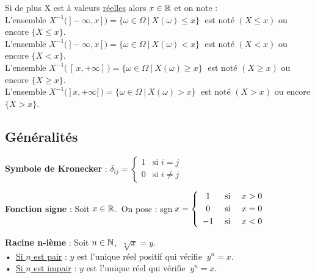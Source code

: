 Si de plus X est à valeurs \underline{réelles} alors \(x\in \mathbb{R}\) et on note :\vspace{0.1cm}\\
L'ensemble \(X^{-1}\bigl(\,]-\infty,x\,]\,\bigr)=\{\omega\in \Omega \ \vert \ X(\omega)\leq x\}\;\) est noté \((X\leq x)\) ou encore \(\{X\leq x\}\).\vspace{0.1cm}\\
L'ensemble \(X^{-1}\bigl(\,]-\infty,x\,[\,\bigr)=\{\omega\in \Omega \ \vert \ X(\omega)< x\}\;\) est noté \((X< x)\) ou encore \(\{X< x\}\).\vspace{0.1cm}\\
L'ensemble \(X^{-1}\bigl(\,[\,x,+\infty]\,\bigr)=\{\omega\in \Omega \ \vert \ X(\omega)\geq x\}\;\) est noté \((X\geq x)\) ou encore \(\{X\geq x\}\).\vspace{0.1cm}\\
L'ensemble \(X^{-1}\bigl(\,]\,x,+\infty[\,\bigr)=\{\omega\in \Omega \ \vert \ X(\omega)> x\}\;\) est noté \((X> x)\) ou encore \(\{X> x\}\).

\vspace{1cm}

\subsection{Généralités}

\vspace{0.8cm}

\textbf{Symbole de Kronecker} : \(\delta_{ij}=\left\{ \begin{array}{cc}
    1 & \text{si } i=j \\
    0 & \text{si } i\neq j
\end{array} \right. \)

\vspace{0.8cm}

\noindent \textbf{Fonction signe} : Soit \(x\in \mathbb{R}\).\,  On pose : sgn\(\,x=\left\{ 
\begin{array}{cll}
    1 & \text{ si } & x>0 \vspace{0.1cm}\\
    0 & \text{ si } & x=0 \vspace{0.1cm}\\
    -1 & \text{ si } & x<0
\end{array} \right. \) 


\vspace{0.8cm}

\textbf{Racine n-ième} : Soit \(n\in \mathbb{N}\)\expo{*}, \(\displaystyle\ \sqrt[n]{x}=y. \)\vspace{0.1cm}\\
•\, \underline{Si $n$ est pair} : $y$ est l'unique réel positif qui vérifie \(\:y^n=x.\)\vspace{0.2cm}\\
•\, \underline{Si $n$ est impair} : $y$ est l'unique réel qui vérifie \(\:y^n=x.\)

